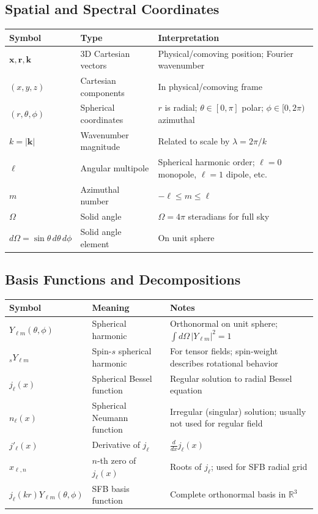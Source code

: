 \subsection{Spatial and Spectral Coordinates}\label{subsec:notation_spatial}

\begin{longtable}{l l p{10cm}}
\toprule
\textbf{Symbol} & \textbf{Type} & \textbf{Interpretation} \\
\midrule
\endhead
\bottomrule
\endfoot

$\mathbf{x}, \mathbf{r}, \mathbf{k}$ & 3D Cartesian vectors & Physical/comoving position; Fourier wavenumber \\
$(x, y, z)$ & Cartesian components & In physical/comoving frame \\
$(r, \theta, \phi)$ & Spherical coordinates & $r$ is radial; $\theta \in [0,\pi]$ polar; $\phi \in [0,2\pi)$ azimuthal \\
$k = |\mathbf{k}|$ & Wavenumber magnitude & Related to scale by $\lambda = 2\pi/k$ \\
$\ell$ & Angular multipole & Spherical harmonic order; $\ell=0$ monopole, $\ell=1$ dipole, etc. \\
$m$ & Azimuthal number & $-\ell \le m \le \ell$ \\
$\Omega$ & Solid angle & $\Omega = 4\pi$ steradians for full sky \\
$d\Omega = \sin\theta \, d\theta \, d\phi$ & Solid angle element & On unit sphere \\
\end{longtable}

\subsection{Basis Functions and Decompositions}\label{subsec:notation_basis}

\begin{longtable}{l l p{10cm}}
\toprule
\textbf{Symbol} & \textbf{Meaning} & \textbf{Notes} \\
\midrule
\endhead
\bottomrule
\endfoot

$Y_{\ell m}(\theta, \phi)$ & Spherical harmonic & Orthonormal on unit sphere; $\int d\Omega \, |Y_{\ell m}|^2 = 1$ \\
${}_s Y_{\ell m}$ & Spin-$s$ spherical harmonic & For tensor fields; spin-weight describes rotational behavior \\
$j_\ell(x)$ & Spherical Bessel function & Regular solution to radial Bessel equation \\
$n_\ell(x)$ & Spherical Neumann function & Irregular (singular) solution; usually not used for regular field \\
$j'_\ell(x)$ & Derivative of $j_\ell$ & $\frac{d}{dx}j_\ell(x)$ \\
$x_{\ell, n}$ & $n$-th zero of $j_\ell(x)$ & Roots of $j_\ell$; used for SFB radial grid \\
$j_\ell(k r) Y_{\ell m}(\theta, \phi)$ & SFB basis function & Complete orthonormal basis in $\mathbb{R}^3$ \\
\end{longtable}

